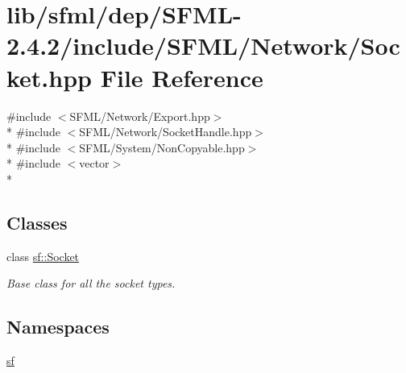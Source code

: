\hypertarget{sfml_2dep_2_s_f_m_l-2_84_82_2include_2_s_f_m_l_2_network_2_socket_8hpp}{\section{lib/sfml/dep/\-S\-F\-M\-L-\/2.4.2/include/\-S\-F\-M\-L/\-Network/\-Socket.hpp File Reference}
\label{sfml_2dep_2_s_f_m_l-2_84_82_2include_2_s_f_m_l_2_network_2_socket_8hpp}
}
{\ttfamily \#include $<$S\-F\-M\-L/\-Network/\-Export.\-hpp$>$}\\*
{\ttfamily \#include $<$S\-F\-M\-L/\-Network/\-Socket\-Handle.\-hpp$>$}\\*
{\ttfamily \#include $<$S\-F\-M\-L/\-System/\-Non\-Copyable.\-hpp$>$}\\*
{\ttfamily \#include $<$vector$>$}\\*
\subsection*{Classes}
\begin{DoxyCompactItemize}
\item 
class \hyperlink{classsf_1_1_socket}{sf\-::\-Socket}
\begin{DoxyCompactList}\small\item\em Base class for all the socket types. \end{DoxyCompactList}\end{DoxyCompactItemize}
\subsection*{Namespaces}
\begin{DoxyCompactItemize}
\item 
\hyperlink{namespacesf}{sf}
\end{DoxyCompactItemize}
